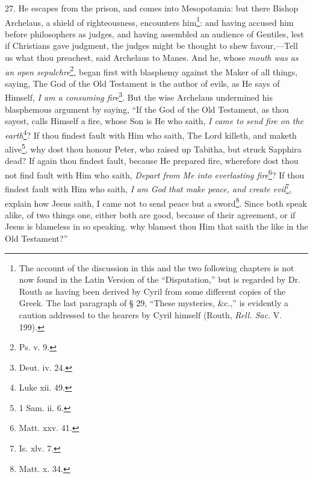 27. He escapes from the prison, and comes into Mesopotamia: but there Bishop Archelaus, a shield of righteousness, encounters him\footnote{The account of the discussion in this and the two following chapters is not now found in the Latin Version of the “Disputation,” but is regarded by Dr. Routh as having been derived by Cyril from some different copies of the Greek. The last paragraph of § 29, “These mysteries, \&c.,” is evidently a caution addressed to the hearers by Cyril himself (Routh, \emph{Rell. Sac}. V. 199).}: and having accused him before philosophers as judges, and having assembled an audience of Gentiles, lest if Christians gave judgment, the judges might be thought to shew favour,—Tell us what thou preachest, said Archelaus to Manes. And he, whose \emph{mouth was as an open sepulchre}\footnote{Ps. v. 9.}, began first with blasphemy against the Maker of all things, saying, The God of the Old Testament is the author of evils, as He says of Himself, \emph{I am a consuming fire}\footnote{Deut. iv. 24.}. But the wise Archelaus undermined his blasphemous argument by saying, “If the God of the Old Testament, as thou sayest, calls Himself a fire, whose Son is He who saith, \emph{I came to send fire on the earth}\footnote{Luke xii. 49.}? If thou findest fault with Him who saith, The Lord killeth, and maketh alive\footnote{1 Sam. ii. 6.}, why dost thou honour Peter, who raised up Tabitha, but struck Sapphira dead? If again thou findest fault, because He prepared fire, wherefore dost thou not find fault with Him who saith, \emph{Depart from Me into everlasting fire}\footnote{Matt. xxv. 41.}? If thou findest fault with Him who saith, \emph{I am God that make peace, and create evil}\footnote{Is. xlv. 7.}, explain how Jesus saith, I came not to send peace but a sword\footnote{Matt. x. 34.}. Since both speak alike, of two things one, either both are good, because of their agreement, or if Jesus is blameless in so speaking. why blamest thou Him that saith the like in the Old Testament?”

